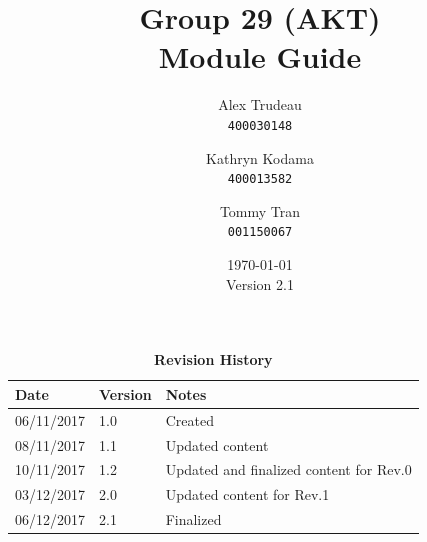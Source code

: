 \documentclass[12pt,fleqn]{article}
\title{Group 29 (AKT)\\ Module Guide}
\author{
Alex Trudeau\\
	\texttt{400030148}
\and
Kathryn Kodama\\
  	\texttt{400013582}
\and
Tommy Tran\\
	\texttt{001150067}
}
\date{\today\\ Version 2.1}
\begin{document}
\maketitle

\pagebreak

\tableofcontents
\listoftables
\listoffigures
\begin{table}[ht]
\caption{\bf Revision History}
\begin{tabularx}{\textwidth}{p{3cm}p{2cm}X}
\toprule {\bf Date} & {\bf Version} & {\bf Notes}\\
\midrule
06/11/2017 & 1.0 & Created\\
08/11/2017 & 1.1 & Updated content\\
10/11/2017 & 1.2 & Updated and finalized content for Rev.0\\
\leavevmode\color{red}03/12/2017 & \leavevmode\color{red}2.0 & \leavevmode\color{red}Updated content for Rev.1\\
\leavevmode\color{red}06/12/2017 & \leavevmode\color{red}2.1 & \leavevmode\color{red}Finalized \\
\bottomrule
\end{tabularx}
\end{table}


\clearpage
\end{document}
